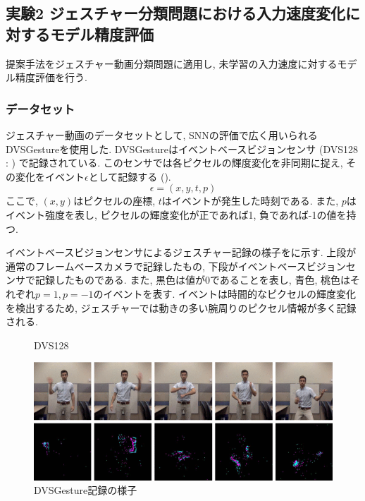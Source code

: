 \subsection{実験2 ジェスチャー分類問題における入力速度変化に対するモデル精度評価}
提案手法をジェスチャー動画分類問題に適用し, 未学習の入力速度に対するモデル精度評価を行う.

\subsubsection{データセット}
ジェスチャー動画のデータセットとして, SNNの評価で広く用いられる\cite{massa2020efficient}DVSGesture\cite{dvsgesture}を使用した.
DVSGestureはイベントベースビジョンセンサ (DVS128 : ) で記録されている.
このセンサでは各ピクセルの輝度変化を非同期に捉え, その変化をイベント$\epsilon$として記録する ().
\begin{equation}
    \epsilon = (x, y, t, p) \label{eq:dvs:event}
\end{equation}
ここで, $(x, y)$はピクセルの座標, $t$はイベントが発生した時刻である.
また, $p$はイベント強度を表し, ピクセルの輝度変化が正であれば1, 負であれば-1の値を持つ.

イベントベースビジョンセンサによるジェスチャー記録の様子をに示す.
上段が通常のフレームベースカメラで記録したもの, 下段がイベントベースビジョンセンサで記録したものである.
また, 黒色は値が0であることを表し, 青色, 桃色はそれぞれ$p=1, p=-1$のイベントを表す.
イベントは時間的なピクセルの輝度変化を検出するため, ジェスチャーでは動きの多い腕周りのピクセル情報が多く記録される.
\begin{figure}[htb]
    \centering
    
    \caption{DVS128\cite{dvs128fig}}
    \label{fig:dvs128}
\end{figure}

\begin{figure}[htb]
    \centering
    \includegraphics[width=1.0\textwidth]{Static/chap2_sec3_dvs_recordview.png}
    \caption{DVSGesture記録の様子\cite{dvsgesture}}
    \label{fig:dvs:recordview}
\end{figure}

